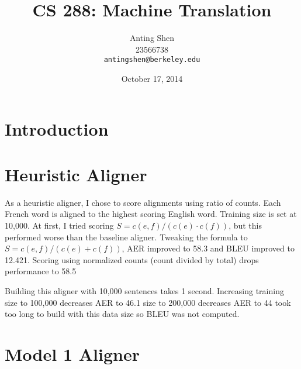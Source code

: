 \documentclass[11pt]{article}
\title{CS 288: Machine Translation}
\author{Anting Shen \\
  23566738 \\
  {\tt antingshen@berkeley.edu} \\
}
\date{October 17, 2014}
\begin{document}
\maketitle

\section{Introduction}


\section{Heuristic Aligner}

As a heuristic aligner, I chose to score alignments using ratio of counts. Each French word
is aligned to the highest scoring English word. Training size is set at 10,000.
At first, I tried scoring $S = c(e, f) / (c(e) \cdot c(f))$, but this performed worse than the
baseline aligner. Tweaking the formula to $S = c(e, f) / (c(e) + c(f))$, AER improved to 58.3%
and BLEU improved to 12.421. Scoring using normalized counts (count divided by total) drops
performance to 58.5%

Building this aligner with 10,000 sentences takes 1 second. Increasing training size to 100,000
decreases AER to 46.1%
size to 200,000 decreases AER to 44%
took too long to build with this data size so BLEU was not computed.

\section{Model 1 Aligner}
\end{document}
